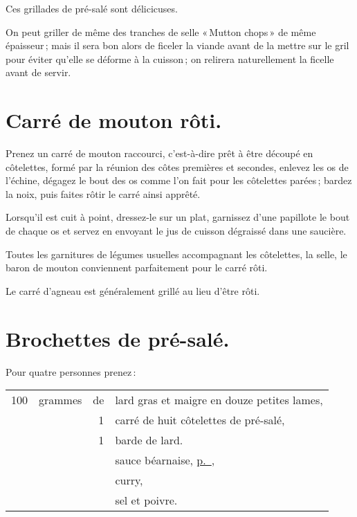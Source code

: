 Ces grillades de pré-salé sont délicicuses.

\sk

On peut griller de même des tranches de selle « Mutton chops » de même
épaisseur ; mais il sera bon alors de ficeler la viande avant de la mettre sur
le gril pour éviter qu'elle se déforme à la cuisson ; on relirera naturellement
la ficelle avant de servir.

\section*{\centering Carré de mouton rôti.}
{}

Prenez un carré de mouton raccourci, c'est-à-dire prêt à être découpé en
côtelettes, formé par la réunion des côtes premières et secondes, enlevez les
os de l'échine, dégagez le bout des os comme l’on fait pour les côtelettes
parées ; bardez la noix, puis faites rôtir le carré ainsi apprêté.

Lorsqu'il est cuit à point, dressez-le sur un plat, garnissez d’une papillote
le bout de chaque os et servez en envoyant le jus de cuisson dégraissé dans une
saucière.

Toutes les garnitures de légumes usuelles accompagnant les côtelettes, la selle,
le baron de mouton conviennent parfaitement pour le carré rôti.

\sk

Le carré d'agneau est généralement grillé au lieu d'être rôti.

\section*{\centering Brochettes de pré-salé.}
{}

Pour quatre personnes prenez :

\medskip

\footnotesize
\begin{longtable}{rrrp{16em}}
    100 & grammes & de & lard gras et maigre en douze petites lames,                                      \\
        &         &  1 & carré de huit côtelettes de pré-salé,                                            \\
        &         &  1 & barde de lard.                                                                   \\
        &         &    & sauce béarnaise, \hyperlink{p0433}{p. \pageref{pg0433}},                         \\
        &         &    & curry,                                                                           \\
        &         &    & sel et poivre.                                                                   \\
\end{longtable}
\normalsize

